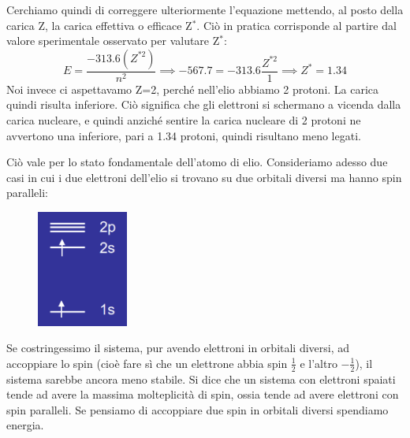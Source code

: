 Cerchiamo quindi di correggere ulteriormente l'equazione mettendo, al posto della carica Z, la carica effettiva o efficace Z$^*$. Ciò in pratica corrisponde al partire dal valore sperimentale osservato per valutare Z$^*$:
$$E=\frac{-313.6(Z^{*2})}{n^2} \implies -567.7=-313.6\frac{Z^{*2}}{1} \implies Z^*=1.34$$
Noi invece ci aspettavamo Z=2, perché nell'elio abbiamo 2 protoni. La carica quindi risulta inferiore. Ciò significa che gli elettroni si schermano a vicenda dalla carica nucleare, e quindi anziché sentire la carica nucleare di 2 protoni ne avvertono una inferiore, pari a 1.34 protoni, quindi risultano meno legati.

\vspace{0.2cm}Ciò vale per lo stato fondamentale dell'atomo di elio. Consideriamo adesso due casi in cui i due elettroni dell'elio si trovano su due orbitali diversi ma hanno spin paralleli:

\hspace{0.5cm}\begin{minipage}{0.25\textwidth}
  \begin{figure}[H]
  \includegraphics[width=3cm]{immagini/elettrone_2s.png}
  \end{figure}
\end{minipage}
\begin{minipage}{0.7\textwidth}
  \vspace{0.6cm}Se costringessimo il sistema, pur avendo elettroni in orbitali diversi, ad accoppiare lo spin (cioè fare sì che un elettrone abbia spin $\frac{1}{2}$ e l'altro $-\frac{1}{2}$), il sistema sarebbe ancora meno stabile. Si dice che un sistema con elettroni spaiati tende ad avere la massima molteplicità di spin, ossia tende ad avere elettroni con spin paralleli. Se pensiamo di accoppiare due spin in orbitali diversi spendiamo energia.\end{minipage}

